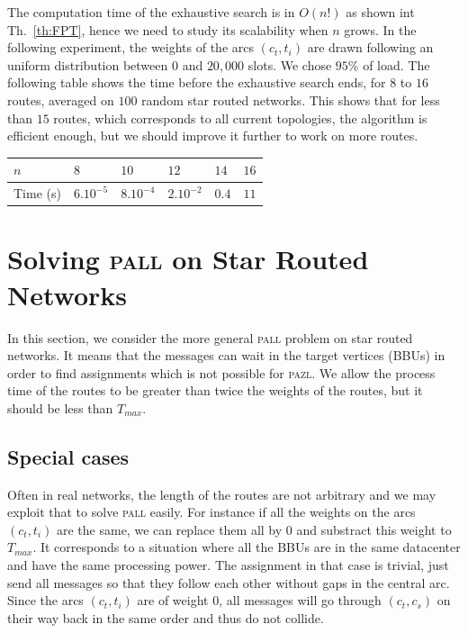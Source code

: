 \documentclass[10pt, conference, letterpaper]{IEEEtran}
\newcommand\pazl{\textsc{pazl}\xspace}
\newcommand\pall{\textsc{pall}\xspace}
\begin{document}
      The computation time of the exhaustive search is in $O(n!)$ as shown int Th.~\ref{th:FPT}, hence we need to study its scalability when $n$ grows. In the following experiment, the weights of the arcs $(c_t,t_i)$ are drawn following an uniform distribution between $0$ and $20,000$ slots. We chose  $95\%$ of load.
      The following table shows the time before the exhaustive search ends, for $8$ to $16$ routes, averaged on $100$ random star routed networks. This shows that for less than $15$ routes, which corresponds to all current topologies, the algorithm is efficient enough, but we should improve it further to work on more routes.
         \begin{center}
         \begin{tabularx}{0.5\textwidth}{|l|X|X|X|X|X|}
    \hline
   $n$ & $8$ & $10$& $12$&$14$& $16$\\
    \hline
   Time (s) & $6.10^{-5}$&$8.10^{-4}$&$2.10^{-2}$& $0.4$& $11$\\
    \hline
      \end{tabularx}
      \end{center}
      
         \section{Solving \pall on Star Routed Networks}\label{sec:PALL}
    
    In this section, we consider the more general \pall problem on star routed networks. It means that the messages can wait in the target vertices (BBUs) in order to find assignments which is not possible for \pazl. We allow the process time of the routes to be greater than twice the weights of the routes, but it should be less than $T_{max}$.

	\subsection{Special cases}
		
		
	Often in real networks, the length of the routes are not arbitrary and we may exploit that to solve \pall easily. For instance if all the weights on the arcs $(c_t,t_i)$ are the same, we can replace them all by $0$ and substract this weight to $T_{max}$. It corresponds to a situation where all the BBUs are in the same datacenter and have the same processing power.
	The assignment in that case is trivial, just send all messages so that they follow each other without gaps in the central arc. Since the arcs $(c_t,t_i)$ are of weight $0$, all messages will go through $(c_t,c_s)$ on their way back in
	the same order and thus do not collide. 
	
\end{document}
